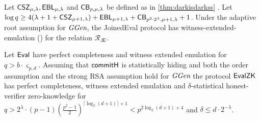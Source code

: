 
\begin{theorem}
	Let $\CSZ,\EBL$ and $\CorrectnessBound$ be defined as in \cref{thm:darkisdarkss} . Let  $\log q \geq 4(\lambda + 1 + \CSZ[\mu+1]) + \EBL[\mu+1] + \mathsf{CB}_{p^2\cdot 2^{\lambda},\mu+1,\lambda} + 1$.
Under the adaptive root assumption for $\ggen$, the \textsf{JoinedEval} protocol has witness-extended-emulation () for the relation $\mathcal{R_\textsf{JE}}$.

Let  $\eval$ have perfect completeness and witness extended emulation for $q> b\cdot \boldsymbol{\varsigma}_{p, d}$. Assuming that $\pro{commitH}$ is statistically hiding and both the order assumption and the strong RSA assumption hold for $\ggen$ the protocol $\pro{EvalZK}$ has perfect completeness, witness extended emulation and $\delta$-statistical honest-verifier zero-knowledge for $q>2^\lambda\cdot (p-1)(\frac{p^2-1}{2})^{\lceil \log_2(d+1)\rceil+1}<p^{2\log_2(d+1)+4}$ and $\delta \leq d \cdot 2^{-\lambda}$.
\end{theorem}

